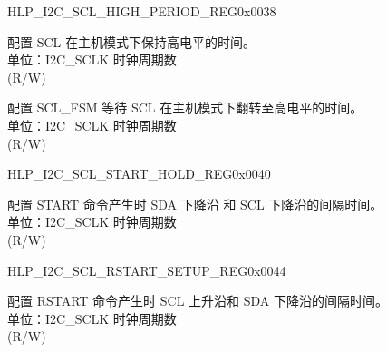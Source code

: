 \begin{register}{H}{LP\_I2C\_SCL\_HIGH\_PERIOD\_REG}{0x0038}\label{regdesc:LPI2CSCLHIGHPERIODREG}
%
%
%
\regnewline%
\begin{regdesc}\begin{reglist}
\label{fielddesc:LPI2CSCLHIGHPERIOD}\item [LP\_I2C\_SCL\_HIGH\_PERIOD] 配置 SCL 在主机模式下保持高电平的时间。\\
单位：I2C\_SCLK 时钟周期数 \\ (R/W)
\label{fielddesc:LPI2CSCLWAITHIGHPERIOD}\item [LP\_I2C\_SCL\_WAIT\_HIGH\_PERIOD] 配置 SCL\_FSM 等待 SCL 在主机模式下翻转至高电平的时间。\\
单位：I2C\_SCLK 时钟周期数 \\ (R/W)
\end{reglist}\end{regdesc}
\end{register}


\begin{register}{H}{LP\_I2C\_SCL\_START\_HOLD\_REG}{0x0040}\label{regdesc:LPI2CSCLSTARTHOLDREG}
%
%
\regnewline%
\begin{regdesc}\begin{reglist}
\label{fielddesc:LPI2CSCLSTARTHOLDTIME}\item [LP\_I2C\_SCL\_START\_HOLD\_TIME] 配置 START 命令产生时 SDA 下降沿 和 SCL 下降沿的间隔时间。\\
单位：I2C\_SCLK 时钟周期数 \\ (R/W)
\end{reglist}\end{regdesc}
\end{register}


\begin{register}{H}{LP\_I2C\_SCL\_RSTART\_SETUP\_REG}{0x0044}\label{regdesc:LPI2CSCLRSTARTSETUPREG}
%
%
\regnewline%
\begin{regdesc}\begin{reglist}
\label{fielddesc:LPI2CSCLRSTARTSETUPTIME}\item [LP\_I2C\_SCL\_RSTART\_SETUP\_TIME] 配置 RSTART 命令产生时 SCL 上升沿和 SDA 下降沿的间隔时间。\\
单位：I2C\_SCLK 时钟周期数 \\ (R/W)
\end{reglist}\end{regdesc}
\end{register}


